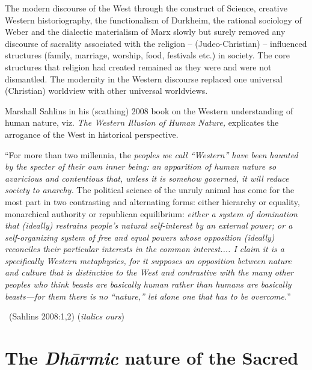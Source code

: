The modern discourse of the West through the construct of Science, creative Western historiography, the functionalism of Durkheim, the rational sociology of Weber and the dialectic materialism of Marx slowly but surely removed any discourse of sacrality associated with the religion – (Judeo-Christian) – influenced structures (family, marriage, worship, food, festivals etc.) in society. The core structures that religion had created remained as they were and were not dismantled. The modernity in the Western discourse replaced one universal (Christian) worldview with other universal worldviews.

Marshall Sahlins in his (scathing) 2008 book on the Western understanding of human nature, viz. \textit{The Western Illusion of Human Nature,} explicates the arrogance of the West in historical perspective.

\begin{myquote}
“For more than two millennia, the \textit{peoples we call “Western” have been haunted by the specter of their own inner being: an apparition of human nature so avaricious and contentious that, unless it is somehow governed, it will reduce society to anarchy.} The political science of the unruly animal has come for the most part in two contrasting and alternating forms: either hierarchy or equality, monarchical authority or republican equilibrium: \textit{either a system of domination that (ideally) restrains people's natural self-interest by an external power; or a self-organizing system of free and equal powers whose opposition (ideally) reconciles their particular interests in the common interest.... I claim it is a specifically Western metaphysics, for it supposes an opposition between nature and culture that is distinctive to the West and contrastive with the many other peoples who think beasts are basically human rather than humans are basically beasts—for them there is no “nature,” let alone one that has to be overcome.}” 

~\hfill (Sahlins 2008:1,2) (\textit{italics ours})
\end{myquote}


\section*{The \textit{Dhārmic} nature of the Sacred}

